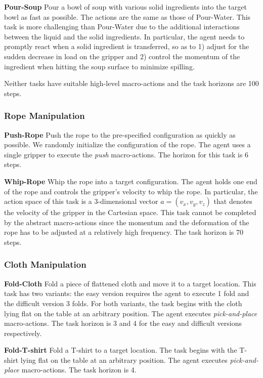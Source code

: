 \textbf{Pour-Soup} Pour a bowl of soup with various solid ingredients into the target bowl as fast as possible.
The actions are the same as those of Pour-Water.
This task is more challenging than Pour-Water due to the additional interactions between the liquid and the solid ingredients.
In particular, the agent needs to promptly react when a solid ingredient is transferred, so as to 1) adjust for the sudden decrease in load on the gripper and 2) control the momentum of the ingredient when hitting the soup surface to minimize spilling.

Neither tasks have suitable high-level macro-actions and the task horizons are 100 steps.

\subsubsection{Rope Manipulation}

\textbf{Push-Rope} Push the rope to the pre-specified configuration as quickly as possible.
We randomly initialize the configuration of the rope.
The agent uses a single gripper to execute the \textit{push} macro-actions.
The horizon for this task is 6 steps.

\textbf{Whip-Rope} Whip the rope into a target configuration. 
The agent holds one end of the rope and controls the gripper's velocity to whip the rope. In particular, the action space of this task is a 3-dimensional vector $a = (v_x, v_y, v_z)$ that denotes the velocity of the gripper in the Cartesian space.
This task cannot be completed by the abstract macro-actions since the momentum and the deformation of the rope has to be adjusted at a relatively high frequency. The task horizon is 70 steps.

\subsubsection{Cloth Manipulation}

\textbf{Fold-Cloth} Fold a piece of flattened cloth and move it to a target location. This task has two variants: the easy version requires the agent to execute 1 fold and the difficult version 3 folds. For both variants, the task begins with the cloth lying flat on the table at an arbitrary position. The agent executes \textit{pick-and-place} macro-actions. The task horizon is 3 and 4 for the easy and difficult versions respectively.

\textbf{Fold-T-shirt} Fold a T-shirt to a target location. The task begins with the T-shirt lying flat on the table at an arbitrary position. The agent executes \textit{pick-and-place} macro-actions. The task horizon is 4.

